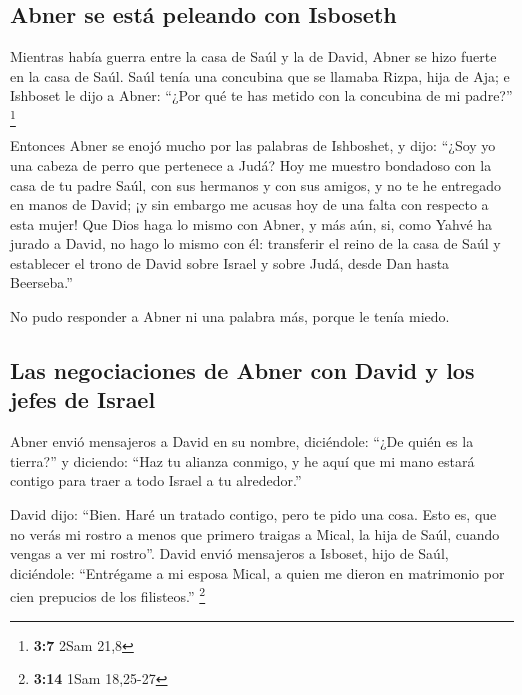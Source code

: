 \hypertarget{abner-se-estuxe1-peleando-con-isboseth}{%
\subsection{Abner se está peleando con
Isboseth}\label{abner-se-estuxe1-peleando-con-isboseth}}

 Mientras había guerra entre la casa de Saúl y la de
David, Abner se hizo fuerte en la casa de Saúl.  Saúl
tenía una concubina que se llamaba Rizpa, hija de Aja; e Ishboset le
dijo a Abner: ``¿Por qué te has metido con la concubina de mi padre?''
\footnote{\textbf{3:7} 2Sam 21,8}

 Entonces Abner se enojó mucho por las palabras de
Ishboshet, y dijo: ``¿Soy yo una cabeza de perro que pertenece a Judá?
Hoy me muestro bondadoso con la casa de tu padre Saúl, con sus hermanos
y con sus amigos, y no te he entregado en manos de David; ¡y sin embargo
me acusas hoy de una falta con respecto a esta mujer!  Que
Dios haga lo mismo con Abner, y más aún, si, como Yahvé ha jurado a
David, no hago lo mismo con él:  transferir el reino de
la casa de Saúl y establecer el trono de David sobre Israel y sobre
Judá, desde Dan hasta Beerseba.''

 No pudo responder a Abner ni una palabra más, porque le
tenía miedo.

\hypertarget{las-negociaciones-de-abner-con-david-y-los-jefes-de-israel}{%
\subsection{Las negociaciones de Abner con David y los jefes de
Israel}\label{las-negociaciones-de-abner-con-david-y-los-jefes-de-israel}}

 Abner envió mensajeros a David en su nombre, diciéndole:
``¿De quién es la tierra?'' y diciendo: ``Haz tu alianza conmigo, y he
aquí que mi mano estará contigo para traer a todo Israel a tu
alrededor.''

 David dijo: ``Bien. Haré un tratado contigo, pero te
pido una cosa. Esto es, que no verás mi rostro a menos que primero
traigas a Mical, la hija de Saúl, cuando vengas a ver mi rostro''.
 David envió mensajeros a Isboset, hijo de Saúl,
diciéndole: ``Entrégame a mi esposa Mical, a quien me dieron en
matrimonio por cien prepucios de los filisteos.'' \footnote{\textbf{3:14}
  1Sam 18,25-27}

